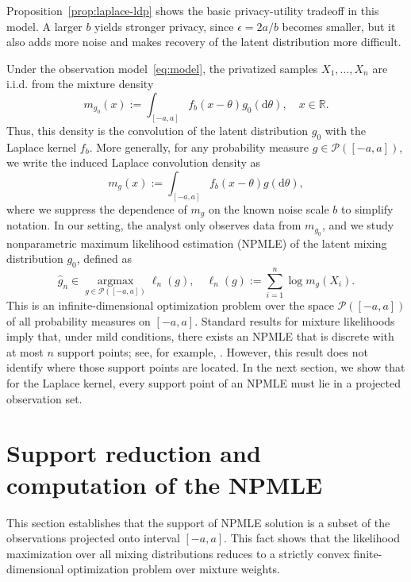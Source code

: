 \documentclass[english, 11pt]{article}
\theoremstyle{plain}
\theoremstyle{definition}
\theoremstyle{remark}
\begin{document}
Proposition~\ref{prop:laplace-ldp} shows the basic privacy-utility tradeoff in this model. A larger $b$ yields stronger privacy, since $\epsilon=2a/b$ becomes smaller, but it also adds more noise and makes recovery of the latent distribution more difficult.

Under the observation model~\eqref{eq:model}, the privatized samples $X_1,\dots,X_n$ are i.i.d. from the mixture density
\begin{equation*}
m_{g_0}(x) := \int_{[-a,a]} f_b(x-\theta) g_0(\mathrm d\theta), \quad x\in\mathbb R.
\end{equation*}
Thus, this density is the convolution of the latent distribution $g_0$ with the Laplace kernel $f_b$.
More generally, for any probability measure $g\in\mathcal P([-a,a])$, we write the induced Laplace convolution density as 
\begin{equation*}
m_g(x) := \int_{[-a,a]} f_b(x-\theta) g(\mathrm d\theta),
\end{equation*}
where we suppress the dependence of $m_g$ on the known noise scale $b$ to simplify notation.
In our setting, the analyst only observes data from $m_{g_0}$, and we study nonparametric maximum likelihood estimation (NPMLE) of the latent mixing distribution $g_0$, defined as 
\begin{equation}\label{eq:npmle}
\widehat g_n \in \mathop{\mathrm{argmax}}\limits_{g\in\mathcal P([-a,a])} \ell_n(g), \quad
\ell_n(g):=\sum_{i=1}^n \log m_g(X_i).
\end{equation}
This is an infinite-dimensional optimization problem over the space $\mathcal P([-a,a])$ of all probability measures on $[-a,a]$.
Standard results for mixture likelihoods imply that, under mild conditions, there exists an NPMLE that is discrete with at most $n$ support points; see, for example, \cite{laird1978nonparametric,lindsay1983geometry}. 
However, this result does not identify where those support points are located. 
In the next section, we show that for the Laplace kernel, every support point of an NPMLE must lie in a projected observation set.

\section{Support reduction and computation of the NPMLE}\label{sec:npmle}

This section establishes that the support of NPMLE solution is a subset of the observations projected onto interval $[-a, a]$. 
This fact shows that the likelihood maximization over all mixing distributions reduces to a strictly convex finite-dimensional optimization problem over mixture weights.
\end{document}
